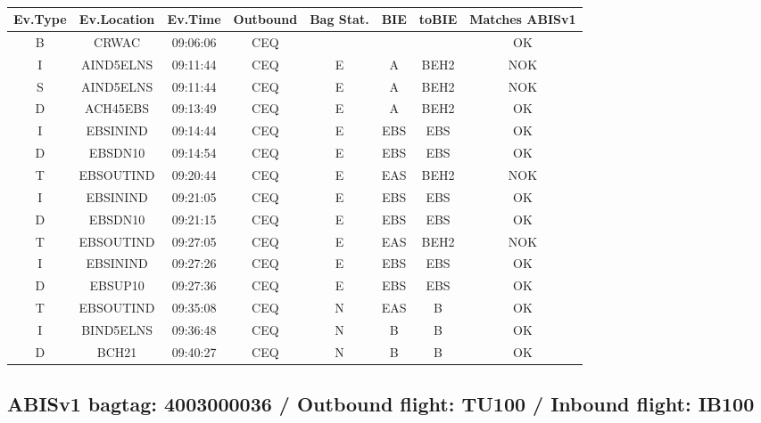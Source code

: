 \documentclass{report}
\begin{document}
\paragraph{}
\begin{longtable}{cccccccc}    \toprule
\rowcolor{white!50}
\textbf{Ev.Type} & \textbf{Ev.Location} & \textbf{Ev.Time} & \textbf{Outbound} & \textbf{Bag Stat.} & \textbf{BIE} & \textbf{toBIE} & \textbf{Matches ABISv1} \\\midrule
B & CRWAC & 09:06:06  & CEQ &  &  &  & OK\\
I & AIND5ELNS & 09:11:44  & CEQ & E & A & BEH2 & NOK\\
S & AIND5ELNS & 09:11:44  & CEQ & E & A & BEH2 & NOK\\
D & ACH45EBS & 09:13:49  & CEQ & E & A & BEH2 & OK\\
I & EBSININD & 09:14:44  & CEQ & E & EBS & EBS & OK\\
D & EBSDN10 & 09:14:54  & CEQ & E & EBS & EBS & OK\\
T & EBSOUTIND & 09:20:44  & CEQ & E & EAS & BEH2 & NOK\\
I & EBSININD & 09:21:05  & CEQ & E & EBS & EBS & OK\\
D & EBSDN10 & 09:21:15  & CEQ & E & EBS & EBS & OK\\
T & EBSOUTIND & 09:27:05  & CEQ & E & EAS & BEH2 & NOK\\
I & EBSININD & 09:27:26  & CEQ & E & EBS & EBS & OK\\
D & EBSUP10 & 09:27:36  & CEQ & E & EBS & EBS & OK\\
T & EBSOUTIND & 09:35:08  & CEQ & N & EAS & B & OK\\
I & BIND5ELNS & 09:36:48  & CEQ & N & B & B & OK\\
D & BCH21 & 09:40:27  & CEQ & N & B & B & OK\\
\bottomrule
\end{longtable}
\subsection*{ABISv1 bagtag: 4003000036 / Outbound flight: TU100 / Inbound flight: IB100}
\end{document}
